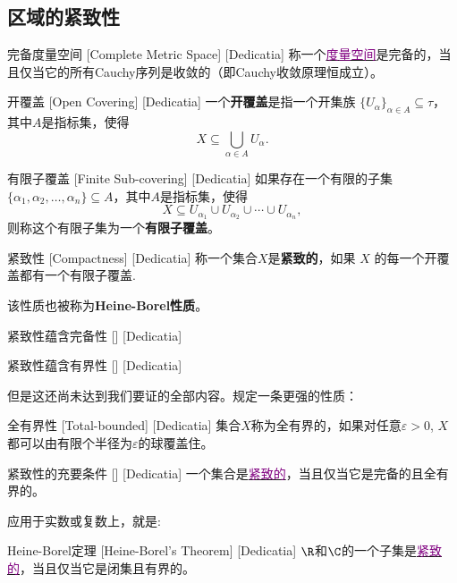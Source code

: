\documentclass[UTF8]{ctexart}
\newcommand{\hyperrefc}[2]{\hyperref[#1]{\textcolor{purple}{#2}}}
\begin{document}
\subsection{区域的紧致性}
\begin{dfn}
    [UUID]
    {完备度量空间}
    [Complete Metric Space]
    [Dedicatia]
    称一个\hyperrefc{dfn:MetricSpace}{度量空间}是完备的，当且仅当它的所有Cauchy序列是收敛的（即Cauchy收敛原理恒成立）。
\end{dfn}
\begin{dfn}
    [UUID]
    {开覆盖}
    [Open Covering]
    [Dedicatia]
    一个\textbf{开覆盖}是指一个开集族 \( \{U_\alpha\}_{\alpha \in A} \subseteq \tau \)，其中$A$是指标集，使得
    \[X \subseteq \bigcup_{\alpha \in A} U_\alpha.\]
\end{dfn}
\begin{dfn}
    [UUID]
    {有限子覆盖}
    [Finite Sub-covering]
    [Dedicatia]
    如果存在一个有限的子集 \( \{\alpha_1, \alpha_2, \ldots, \alpha_n\} \subseteq A \)，其中$A$是指标集，使得
    \[X \subseteq U_{\alpha_1} \cup U_{\alpha_2} \cup \cdots \cup U_{\alpha_n},\]
    则称这个有限子集为一个\textbf{有限子覆盖}。
\end{dfn}
\begin{dfn}
    [Compactness]
    {紧致性}
    [Compactness]
    [Dedicatia]
    称一个集合$X$是\textbf{紧致的}，如果 \(X\) 的每一个开覆盖都有一个有限子覆盖.
\end{dfn}
该性质也被称为\textbf{Heine-Borel性质}。
\begin{thm}
    [UUID]
    {紧致性蕴含完备性}
    []
    [Dedicatia]
\end{thm}
\begin{thm}
    [UUID]
    {紧致性蕴含有界性}
    []
    [Dedicatia]
\end{thm}
但是这还尚未达到我们要证的全部内容。规定一条更强的性质：
\begin{dfn}
    [UUID]
    {全有界性}
    [Total-bounded]
    [Dedicatia]
    集合$X$称为全有界的，如果对任意$\varepsilon>0$, $X$都可以由有限个半径为$\varepsilon$的球覆盖住。
\end{dfn}
\begin{thm}
    [UUID]
    {紧致性的充要条件}
    []
    [Dedicatia]
    一个集合是\hyperrefc{dfn:Compactness}{紧致的}，当且仅当它是完备的且全有界的。
\end{thm}
应用于实数或复数上，就是:
\begin{xmp}
    [UUID]
    {Heine-Borel定理}
    [Heine-Borel's Theorem]
    [Dedicatia]
    $\R$和$\C$的一个子集是\hyperrefc{dfn:Compactness}{紧致的}，当且仅当它是闭集且有界的。
\end{xmp}
\end{document}
